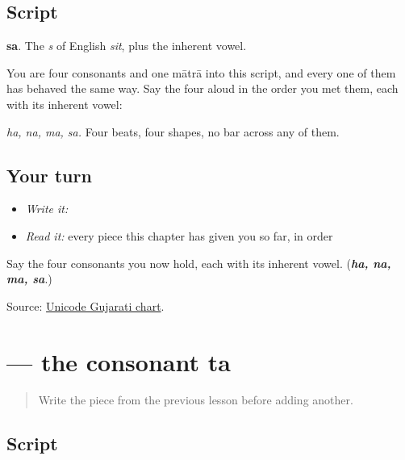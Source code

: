 \subsection*{Script}
\begin{quote}
\end{quote}

\textbf{sa}. The \emph{s} of English \emph{sit}, plus the inherent vowel.

You are four consonants and one mātrā into this script, and every one of them has behaved the same way. Say the four aloud in the order you met them, each with its inherent vowel:

\begin{quote}
\textbf{}   \textbf{}   \textbf{}   \textbf{}
\end{quote}

\emph{ha, na, ma, sa.} Four beats, four shapes, no bar across any of them.

\subsection*{Your turn}
\begin{itemize}
\raggedright
  \item \emph{Write it:} 
  \item \emph{Read it:} every piece this chapter has given you so far, in order
\end{itemize}

\begin{tcolorbox}[breakable,colback=teal!4,colframe=teal!35!black,title={Before you move on}]
Say the four consonants you now hold, each with its inherent vowel. (\emph{\textbf{ha, na, ma, sa}}.)

Source: \href{https://www.unicode.org/charts/PDF/U0A80.pdf}{Unicode Gujarati chart}.
\end{tcolorbox}
\section[ta]{ — the consonant ta}

\label{lesson:GU-W01-ta}



\begin{quote}
Write the piece from the previous lesson before adding another.
\end{quote}

\subsection*{Script}
\begin{quote}
\end{quote}

